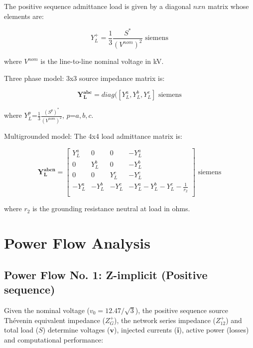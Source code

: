 \documentclass[12pt]{article}
\begin{document}
The positive sequence admittance load is given by a diagonal $n x n$ matrix whose elements are:

\begin{equation}
{Y}^{+}_{L}=\frac{1}{3}\frac{{S}^*}{(V^{nom})^2}\mbox{ siemens} 
\end{equation} 

where $V^{nom}$ is the line-to-line nominal voltage in kV.


Three phase model: 3x3 source impedance matrix is:

\begin{equation}
\mathbf{Y^{abc}_{L}}=diag([{Y}^a_{L},{Y}^b_{L},{Y}^c_{L}]\mbox{ siemens}
\end{equation} 

where ${Y}^p_{L}$=$\frac{1}{3}\frac{({S}^p)^*}{(V^{nom})^2}$, $p$=$a,b,c$.

Multigrounded model: The 4x4 load admittance matrix is:

\begin{equation}
\mathbf{Y^{abcn}_{L}}=\left[ \begin{array}{cccc}
               {Y}^{a}_{L} &0  &0 & -{Y}^{a}_{L}\\
              0 & {Y}^{b}_{L}  &0 & -{Y}^{b}_{L}\\
               0 &0  &{Y}^{c}_{L} & -{Y}^{c}_{L}\\
               -{Y}^{a}_{L} & -{Y}^{b}_{L}  &-{Y}^{c}_{L} & -{Y}^{a}_{L}-{Y}^{b}_{L}-{Y}^{c}_{L}-\frac{1}{r_2}\\
             \end{array}
           \right] \mbox{ siemens}\end{equation}
  
where $r_2$ is the grounding resistance neutral at load in ohms. 

\section{Power Flow Analysis}

\subsection{Power Flow No. 1: Z-implicit (Positive sequence)}

Given the nominal voltage ($v_0=12.47/\sqrt{3}$), the positive sequence source Th\'evenin equivalent impedance (${Z}^{+}_{G}$), the network series impedance (${Z}^{+}_{12}$) and total load (${S}$)
determine voltages ($\bm{v}$), injected currents ($\mathbf{i}$), active power (losses) and computational performance:
    
\end{document}
